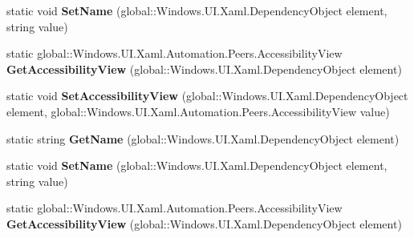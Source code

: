 \begin{DoxyCompactItemize}
static void {\bfseries Set\+Name} (global\+::\+Windows.\+U\+I.\+Xaml.\+Dependency\+Object element, string value)
\item 
\mbox{\label{class_windows_1_1_u_i_1_1_xaml_1_1_automation_1_1_automation_properties_a31d697be3f31155ecf22e524a584d4dc}} 
static global\+::\+Windows.\+U\+I.\+Xaml.\+Automation.\+Peers.\+Accessibility\+View {\bfseries Get\+Accessibility\+View} (global\+::\+Windows.\+U\+I.\+Xaml.\+Dependency\+Object element)
\item 
\mbox{\label{class_windows_1_1_u_i_1_1_xaml_1_1_automation_1_1_automation_properties_aac7e51cabcc5d52f7def17b31f53f18b}} 
static void {\bfseries Set\+Accessibility\+View} (global\+::\+Windows.\+U\+I.\+Xaml.\+Dependency\+Object element, global\+::\+Windows.\+U\+I.\+Xaml.\+Automation.\+Peers.\+Accessibility\+View value)
\item 
\mbox{\label{class_windows_1_1_u_i_1_1_xaml_1_1_automation_1_1_automation_properties_a467b1c94670b22d8bd778de6351a09b5}} 
static string {\bfseries Get\+Name} (global\+::\+Windows.\+U\+I.\+Xaml.\+Dependency\+Object element)
\item 
\mbox{\label{class_windows_1_1_u_i_1_1_xaml_1_1_automation_1_1_automation_properties_a4f2659d7e86be152ef660f9c7e6fd422}} 
static void {\bfseries Set\+Name} (global\+::\+Windows.\+U\+I.\+Xaml.\+Dependency\+Object element, string value)
\item 
\mbox{\label{class_windows_1_1_u_i_1_1_xaml_1_1_automation_1_1_automation_properties_a31d697be3f31155ecf22e524a584d4dc}} 
static global\+::\+Windows.\+U\+I.\+Xaml.\+Automation.\+Peers.\+Accessibility\+View {\bfseries Get\+Accessibility\+View} (global\+::\+Windows.\+U\+I.\+Xaml.\+Dependency\+Object element)
\item 
\mbox{\label{class_windows_1_1_u_i_1_1_xaml_1_1_automation_1_1_automation_properties_aac7e51cabcc5d52f7def17b31f53f18b}} 

\end{DoxyCompactItemize}
